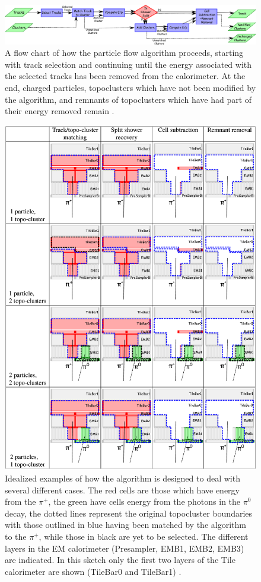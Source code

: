 		\begin{figure}[!ht]
		\centering
		\includegraphics[width=\textwidth,keepaspectratio=true]{chapters/chapter5_eventreconnstruction/images/pflow_flow_chart.png}
		\caption{\label{fig:pflow-flowchart} A flow chart of how the particle flow algorithm proceeds, starting with track selection and continuing until the energy associated with the selected tracks has been removed from the calorimeter. At the end, charged particles, topoclusters which have not been modified by the algorithm, and remnants of topoclusters which have had part of their energy removed remain \cite{pflow}.}
		\end{figure}

		\begin{figure}[!ht]
		\centering
		\includegraphics[width=.75\textwidth,keepaspectratio=true]{chapters/chapter5_eventreconnstruction/images/pflow_example.png}
		\caption{\label{fig:pflow-example} Idealized examples of how the algorithm is designed to deal with several different cases. The red cells are those which have energy from the $\pi^{+}$, the green have cells energy from the photons in the $\pi^{0}$  decay, the dotted lines represent the original topocluster boundaries with those outlined in blue having been matched by the algorithm to the $\pi^{+}$, while those in black are yet to be selected. The different layers in the EM calorimeter (Presampler, EMB1, EMB2, EMB3) are indicated. In this sketch only the first two layers of the Tile calorimeter are shown (TileBar0 and TileBar1) \cite{pflow}.}
		\end{figure}

